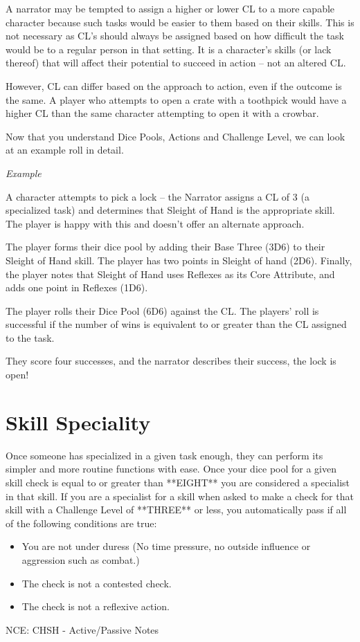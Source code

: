 A narrator may be tempted to assign a higher or lower CL to a more capable character because such tasks would be easier to them based on their skills. This is not necessary as CL’s should always be assigned based on how difficult the task would be to a regular person in that setting. It is a character’s skills (or lack thereof) that will affect their potential to succeed in action – not an altered CL.

However, CL can differ based on the approach to action, even if the outcome is the same. A player who attempts to open a crate with a toothpick would have a higher CL than the same character attempting to open it with a crowbar.

Now that you understand Dice Pools, Actions and Challenge Level, we can look at an example roll in detail.

\textit{Example}

A character attempts to pick a lock – the Narrator assigns a CL of 3 (a specialized task) and determines that Sleight of Hand is the appropriate skill. The player is happy with this and doesn't offer an alternate approach.

The player forms their dice pool by adding their Base Three (3D6) to their Sleight of Hand skill. The player has two points in Sleight of hand (2D6). Finally, the player notes that Sleight of Hand uses Reflexes as its Core Attribute, and adds one point in Reflexes (1D6).

The player rolls their Dice Pool (6D6) against the CL. The players' roll is successful if the number of wins is equivalent to or greater than the CL assigned to the task.

They score four successes, and the narrator describes their success, the lock is open!

\section{Skill Speciality} \label{sec:skill_speciality}

Once someone has specialized in a given task enough, they can perform its simpler and more routine functions with ease. Once your dice pool for a given skill check is equal to or greater than **EIGHT** you are considered a specialist in that skill. If you are a specialist for a skill when asked to make a check for that skill with a Challenge Level of **THREE** or less, you automatically pass if all of the following conditions are true:

\begin{itemize}
    \item You are not under duress (No time pressure, no outside influence or aggression such as combat.)
    \item The check is not a contested check.
    \item The check is not a reflexive action.
\end{itemize}

NCE: CHSH - Active/Passive Notes